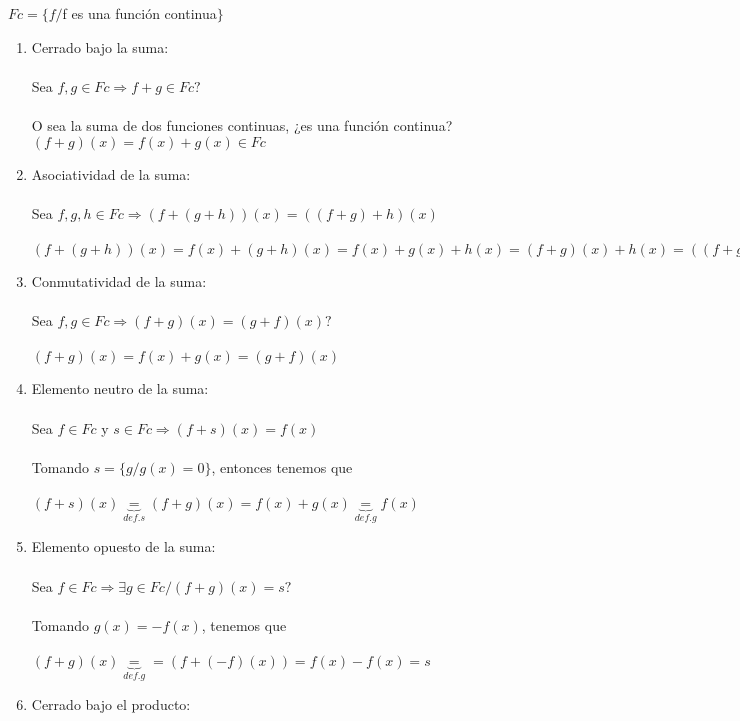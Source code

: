 \documentclass{article}
\begin{document}
\begin{enumerate}[1.]
$Fc = \lbrace f / $f es una función continua$ \rbrace$


\begin{enumerate}[(1)]
\item

	Cerrado bajo la suma: \\ \\ 
	Sea $f,g \in Fc \Rightarrow f+g \in Fc?$ \\ \\
	O sea la suma de dos funciones continuas, ¿es una función continua?\\
	$(f+g)(x) = f(x) + g(x) \in Fc$

\item
	Asociatividad de la suma: \\ \\
	Sea $f,g,h \in Fc \Rightarrow (f+(g+h))(x) = ((f+g)+h)(x)$ \\ \\
	$(f+(g+h))(x) = f(x) + (g+h)(x) = f(x) + g(x) + h(x) = (f+g)(x) + h(x) = ((f+g)+h)(x)$ \\
\item
	Conmutatividad de la suma: \\ \\
	Sea $f,g \in Fc \Rightarrow (f+g)(x) = (g+f)(x)?$ \\ \\
	$(f+g)(x) = f(x)+g(x) = (g+f)(x)$
\item
	Elemento neutro de la suma: \\ \\
	Sea $f \in Fc$ y $s \in Fc \Rightarrow (f+s)(x) = f(x)$  \\ \\
	Tomando $s = \lbrace g / g(x) = 0 \rbrace$, entonces tenemos que \\ \\
	$(f+s)(x) \underbrace{=}_{def.s} (f+g)(x) = f(x)+g(x) \underbrace{=}_{def.g} f(x)$
\item
	Elemento opuesto de la suma: \\ \\
	Sea $f \in Fc \Rightarrow \exists g \in Fc / (f+g)(x) = s?$ \\ \\ 
	Tomando $g(x) = -f(x)$, tenemos que \\ \\
	$(f+g)(x) \underbrace{=}_{def.g} = (f+(-f)(x)) = f(x) - f(x) = s$ \\ 
\item
	Cerrado bajo el producto: \\ \\

\end{enumerate}
\end{enumerate}
\end{document}

